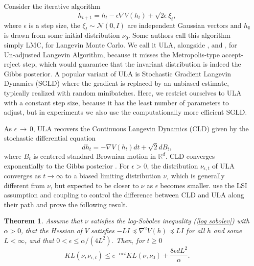 \documentclass{article} %
\newtheorem{theorem}{Theorem}[section]
\newcommand{\massi}[2][]{\todo[color=brown!20,#1]{{\bf MP:} #2}}
\begin{document}
Consider the iterative algorithm 
\begin{equation}
h_{t+1}=h_{t}-\epsilon \nabla V\left( h_{t}\right) +\sqrt{2\epsilon }\xi
_{t},  \label{LMC}
\end{equation}%
where $\epsilon $ is a step size, the $\xi _{t}\sim \mathcal{N}\left(
0,I\right) $ are independent Gaussian vectors and $h_{0}$ is drawn from some
initial distribution $\nu _{0}$. Some authors call this algorithm simply
LMC, for Langevin Monte Carlo. We call it ULA, alongside \cite{durmus2017nonasymptotic},\cite{dwivedi2019log} and \cite{vempala2019rapid}, for Un-adjusted Langevin Algorithm, because it misses the Metropolis-type accept-reject step, which would guarantee that the invariant distribution is indeed the Gibbs posterior. A popular variant of ULA is Stochastic Gradient Langevin Dynamics (SGLD) \citep{welling2011bayesian,raginsky2017non} where the gradient is replaced by an
unbiased estimate, typically realized with random minibatches. Here, we restrict ourselves to ULA with a constant step size, because it has
the least number of parameters to adjust, but in experiments we also use the computationally more efficient SGLD.

As $\epsilon \,{\rightarrow}\, 0$, ULA recovers the Continuous Langevin Dynamics
(CLD) given by the stochastic differential equation
\begin{equation*}
dh_{t}=- \nabla V\left( h_{t}\right) dt+\sqrt{2}dB_{t},
\end{equation*}%
where $B_{t}$ is centered standard Brownian motion in $\mathbb{R}^{d}$. CLD
converges exponentially to the Gibbs posterior \citep{chiang1987diffusion}.
For $\epsilon >0$, the distribution $\nu _{\epsilon ,t}$ of ULA converges as $
t\rightarrow \infty $ to a biased limiting distribution $\nu _{\epsilon }$
which is generally different from $\nu $, but expected to be closer to $\nu $
as $\epsilon $ becomes smaller. \cite{vempala2019rapid} use the LSI
assumption and coupling to control the difference between CLD and ULA along
their path and prove the following result.

\begin{theorem}\label{Theorem Vempala}
Assume that $\nu $ satisfies the log-Sobolev
inequality (\ref{log sobolev}) with $\alpha >0$, that the Hessian of $V$
satisfies $-LI\preceq \nabla ^{2}V\left( h\right) \preceq LI$ for all $h$
and some $L<\infty $, and that $0<\epsilon \leq \alpha /\left( 4L^{2}\right) 
$. Then, for $t\geq 0$%
\begin{equation*}
KL\left( \nu ,\nu _{\epsilon ,t}\right) \leq e^{-\alpha \epsilon t}KL\left(
\nu ,\nu _{0}\right) +\frac{8\epsilon dL^{2}}{\alpha }.
\end{equation*}
\end{theorem}
\end{document}
